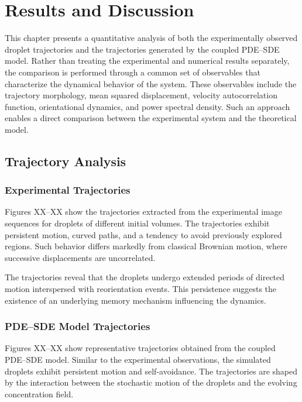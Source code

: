 \chapter{Results and Discussion}

This chapter presents a quantitative analysis of both the experimentally observed droplet trajectories and the trajectories generated by the coupled PDE--SDE model. Rather than treating the experimental and numerical results separately, the comparison is performed through a common set of observables that characterize the dynamical behavior of the system. These observables include the trajectory morphology, mean squared displacement, velocity autocorrelation function, orientational dynamics, and power spectral density. Such an approach enables a direct comparison between the experimental system and the theoretical model.

\section{Trajectory Analysis}

\subsection{Experimental Trajectories}

Figures XX--XX show the trajectories extracted from the experimental image sequences for droplets of different initial volumes. The trajectories exhibit persistent motion, curved paths, and a tendency to avoid previously explored regions. Such behavior differs markedly from classical Brownian motion, where successive displacements are uncorrelated.

The trajectories reveal that the droplets undergo extended periods of directed motion interspersed with reorientation events. This persistence suggests the existence of an underlying memory mechanism influencing the dynamics.

\subsection{PDE--SDE Model Trajectories}

Figures XX--XX show representative trajectories obtained from the coupled PDE--SDE model. Similar to the experimental observations, the simulated droplets exhibit persistent motion and self-avoidance. The trajectories are shaped by the interaction between the stochastic motion of the droplets and the evolving concentration field.

